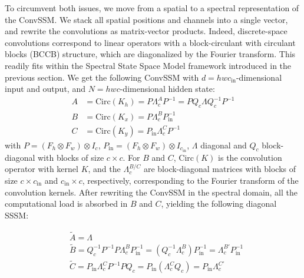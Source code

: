 \documentclass{article}
\begin{document}
To circumvent both issues, we move from a spatial to a spectral representation of the ConvSSM. We stack all spatial positions and channels into a single vector, and rewrite the convolutions as matrix-vector products.
%
Indeed, discrete-space convolutions correspond to linear operators with a block-circulant with circulant blocks (BCCB) structure, which are diagonalized by the Fourier transform. This readily fits within the Spectral State Space Model framework introduced in the previous section. We get the following ConvSSM with $d = h w c_\mathrm{in}$-dimensional input and output, and $N = h w c$-dimensional hidden state:
%
\begin{align}
\label{eq:convssm:A}
A &= \mathrm{Circ}(K_h) = P \Lambda^A_c P^{-1} = P Q_c \Lambda Q_c^{-1} P^{-1} \\
\label{eq:convssm:B}
B &= \mathrm{Circ}(K_x) = P \Lambda^B_c P_{\mathrm{in}}^{-1} \\
\label{eq:convssm:C}
C &= \mathrm{Circ}(K_y) = P_{\mathrm{in}} \Lambda^C_c P^{-1}
\end{align}
%
with $P = (F_h \otimes F_w) \otimes I_c$, $P_{\mathrm{in}} = (F_h \otimes F_w) \otimes I_{c_\mathrm{in}}$, $\Lambda$ diagonal and $Q_c$ block-diagonal with blocks of size $c \!\times\! c$. For $B$ and $C$, $\mathrm{Circ}(K)$ is the convolution operator with kernel $K$, and the $\Lambda^{B/C}_c$ are block-diagonal matrices with blocks of size $c \!\times\! c_\mathrm{in}$ and $c_\mathrm{in} \!\times\! c$, respectively, corresponding to the Fourier transform of the convolution kernels.
%
After rewriting the ConvSSM in the spectral domain, all the computational load is absorbed in $B$ and $C$, yielding the following diagonal SSSM:

\begin{align}
\label{eq:convssm}
&\boxed{\widetilde{A} = \Lambda} \\
&\widetilde{B} = Q_c^{-1} P^{-1} P \Lambda^B_c P_{\mathrm{in}}^{-1} = \left(Q_c^{-1} \Lambda^B_c\right) P_{\mathrm{in}}^{-1} \boxed{= \Lambda^{B'}_c P_{\mathrm{in}}^{-1}} \\
&\widetilde{C} = P_{\mathrm{in}} \Lambda^C_c P^{-1} P Q_c = P_{\mathrm{in}} \left(\Lambda^C_c Q_c\right) \boxed{= P_{\mathrm{in}} \Lambda^{C'}_c}
\end{align}
\end{document}
